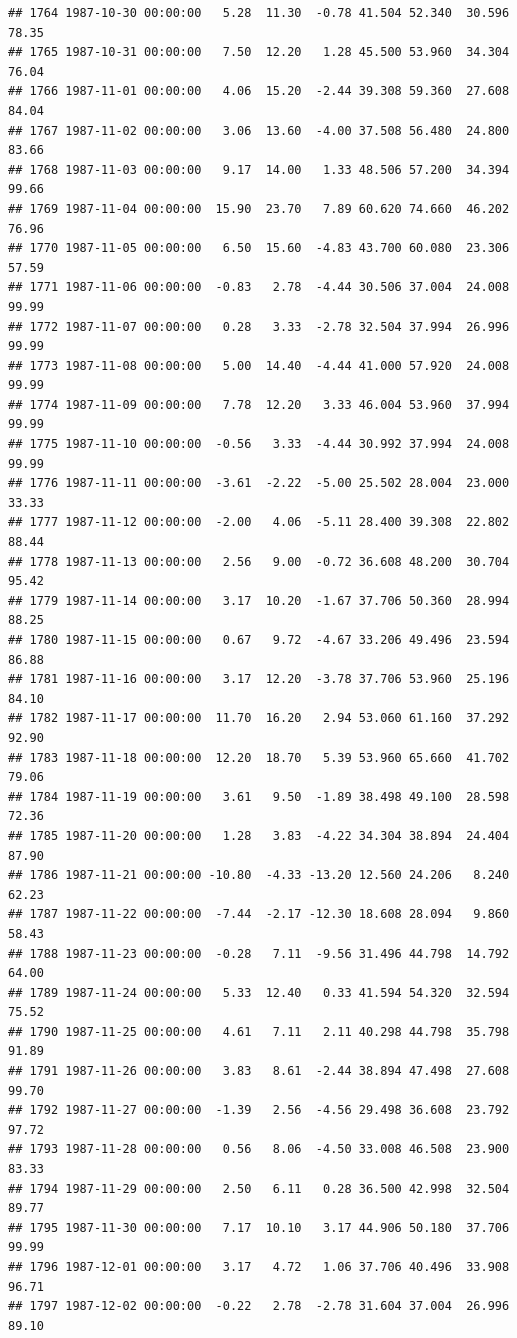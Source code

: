 \documentclass{article}\usepackage{graphicx, color}
\makeatletter
\newenvironment{kframe}{%
 \def\at@end@of@kframe{}%
 \ifinner\ifhmode%
  \def\at@end@of@kframe{\end{minipage}}%
  \begin{minipage}{\columnwidth}%
 \fi\fi%
 \def\FrameCommand##1{\hskip\@totalleftmargin \hskip-\fboxsep
 \colorbox{shadecolor}{##1}\hskip-\fboxsep
     \hskip-\linewidth \hskip-\@totalleftmargin \hskip\columnwidth}%
 \MakeFramed {\advance\hsize-\width
   \@totalleftmargin\z@ \linewidth\hsize
   \@setminipage}}%
 {\par\unskip\endMakeFramed%
 \at@end@of@kframe}
\newenvironment{knitrout}{}{} %
\makeatother
\begin{document}
\begin{knitrout}
\begin{kframe}
\begin{verbatim}
## 1764 1987-10-30 00:00:00   5.28  11.30  -0.78 41.504 52.340  30.596  78.35
## 1765 1987-10-31 00:00:00   7.50  12.20   1.28 45.500 53.960  34.304  76.04
## 1766 1987-11-01 00:00:00   4.06  15.20  -2.44 39.308 59.360  27.608  84.04
## 1767 1987-11-02 00:00:00   3.06  13.60  -4.00 37.508 56.480  24.800  83.66
## 1768 1987-11-03 00:00:00   9.17  14.00   1.33 48.506 57.200  34.394  99.66
## 1769 1987-11-04 00:00:00  15.90  23.70   7.89 60.620 74.660  46.202  76.96
## 1770 1987-11-05 00:00:00   6.50  15.60  -4.83 43.700 60.080  23.306  57.59
## 1771 1987-11-06 00:00:00  -0.83   2.78  -4.44 30.506 37.004  24.008  99.99
## 1772 1987-11-07 00:00:00   0.28   3.33  -2.78 32.504 37.994  26.996  99.99
## 1773 1987-11-08 00:00:00   5.00  14.40  -4.44 41.000 57.920  24.008  99.99
## 1774 1987-11-09 00:00:00   7.78  12.20   3.33 46.004 53.960  37.994  99.99
## 1775 1987-11-10 00:00:00  -0.56   3.33  -4.44 30.992 37.994  24.008  99.99
## 1776 1987-11-11 00:00:00  -3.61  -2.22  -5.00 25.502 28.004  23.000  33.33
## 1777 1987-11-12 00:00:00  -2.00   4.06  -5.11 28.400 39.308  22.802  88.44
## 1778 1987-11-13 00:00:00   2.56   9.00  -0.72 36.608 48.200  30.704  95.42
## 1779 1987-11-14 00:00:00   3.17  10.20  -1.67 37.706 50.360  28.994  88.25
## 1780 1987-11-15 00:00:00   0.67   9.72  -4.67 33.206 49.496  23.594  86.88
## 1781 1987-11-16 00:00:00   3.17  12.20  -3.78 37.706 53.960  25.196  84.10
## 1782 1987-11-17 00:00:00  11.70  16.20   2.94 53.060 61.160  37.292  92.90
## 1783 1987-11-18 00:00:00  12.20  18.70   5.39 53.960 65.660  41.702  79.06
## 1784 1987-11-19 00:00:00   3.61   9.50  -1.89 38.498 49.100  28.598  72.36
## 1785 1987-11-20 00:00:00   1.28   3.83  -4.22 34.304 38.894  24.404  87.90
## 1786 1987-11-21 00:00:00 -10.80  -4.33 -13.20 12.560 24.206   8.240  62.23
## 1787 1987-11-22 00:00:00  -7.44  -2.17 -12.30 18.608 28.094   9.860  58.43
## 1788 1987-11-23 00:00:00  -0.28   7.11  -9.56 31.496 44.798  14.792  64.00
## 1789 1987-11-24 00:00:00   5.33  12.40   0.33 41.594 54.320  32.594  75.52
## 1790 1987-11-25 00:00:00   4.61   7.11   2.11 40.298 44.798  35.798  91.89
## 1791 1987-11-26 00:00:00   3.83   8.61  -2.44 38.894 47.498  27.608  99.70
## 1792 1987-11-27 00:00:00  -1.39   2.56  -4.56 29.498 36.608  23.792  97.72
## 1793 1987-11-28 00:00:00   0.56   8.06  -4.50 33.008 46.508  23.900  83.33
## 1794 1987-11-29 00:00:00   2.50   6.11   0.28 36.500 42.998  32.504  89.77
## 1795 1987-11-30 00:00:00   7.17  10.10   3.17 44.906 50.180  37.706  99.99
## 1796 1987-12-01 00:00:00   3.17   4.72   1.06 37.706 40.496  33.908  96.71
## 1797 1987-12-02 00:00:00  -0.22   2.78  -2.78 31.604 37.004  26.996  89.10

\end{verbatim}
\end{kframe}
\end{knitrout}
\end{document}
